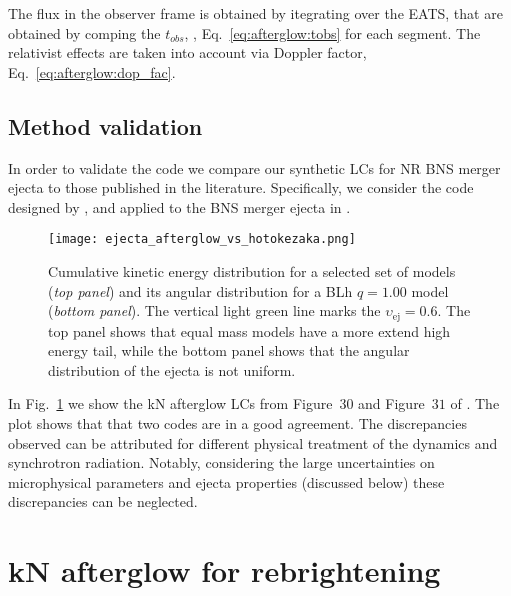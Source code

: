 The flux in the observer frame is obtained by itegrating over the \ac{EATS}, 
that are obtained by comping the $t_{obs}$, \ie, Eq.~\eqref{eq:afterglow:tobs} 
for each segment. The relativist effects are taken into account via 
Doppler factor, Eq.~\eqref{eq:afterglow:dop_fac}.






\subsection{Method validation}

In order to validate the code we compare our synthetic \acp{LC} for \ac{NR} 
\ac{BNS} merger ejecta to those published in the literature. 
Specifically, we consider the code designed by \citet{Hotokezaka:2015eja},
and applied to the \ac{BNS} merger ejecta in \citet{Radice:2018pdn}.

\begin{figure}%
    \centering 
    \texttt{[image: ejecta\_afterglow\_vs\_hotokezaka.png]}
    \caption{
        Cumulative kinetic energy distribution for a selected set of models (\textit{top panel}) 
        and its angular distribution for a BLh $q=1.00$ model (\textit{bottom panel}).
        The vertical light green line marks the $\upsilon_{\text{ej}}=0.6$.
        The top panel shows that equal mass models have a more extend high energy tail,
        while the bottom panel shows that the angular distribution of the ejecta is not 
        uniform.
    } 
    \label{fig:afg_test}
\end{figure}

In Fig.~\ref{fig:afg_test} we show the \ac{kN} afterglow \acp{LC} from 
Figure~$30$ and Figure~$31$ of \citet{Radice:2018pdn}. The plot shows that that 
two codes are in a good agreement. The discrepancies observed can be attributed 
for different physical treatment of the \blast{} dynamics and synchrotron radiation. 
Notably, considering the large uncertainties on microphysical parameters and 
ejecta properties (discussed below) these discrepancies can be neglected.



\section{\ac{kN} afterglow for \GRB{} rebrightening} \label{sec:afterglow:results}


